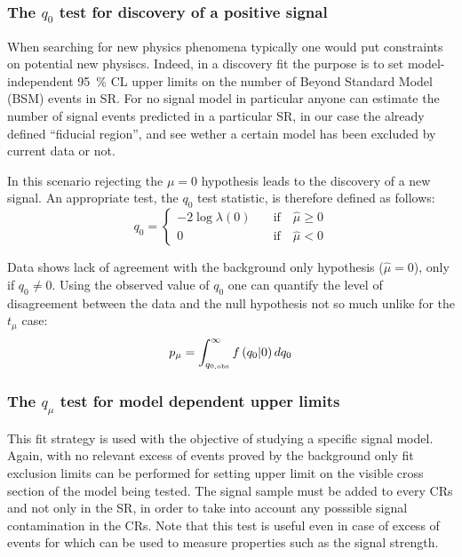 \subsubsection{The $q_0$ test for discovery of a positive signal}
When searching for new physics phenomena typically one would put constraints on potential new physiscs. Indeed, in a discovery fit the purpose is to set model-independent \SI{95}{\percent} CL upper limits on the number of Beyond Standard Model (BSM) events in SR. For no signal model in particular anyone can estimate the number of signal events predicted in a particular SR, in our case the already defined ``fiducial region'', and see wether a certain model has been excluded by current data or not.

In this scenario rejecting the $\mu = 0$ hypothesis leads to the discovery of a new signal.  An appropriate test, the $q_0$ test statistic, is therefore defined as follows:
\begin{equation}
q_0=
\left\{
\begin{aligned}
-2\log{\lambda(0)}\quad &\text{if}\quad \hat{\mu}\ge0\\
 0 \qquad&\text{if}\quad \hat{\mu}<0
\end{aligned}
\right.
\end{equation} 

Data shows lack of agreement with the background only hypothesis ($\hat{\mu}=0$), only if $q_0\ne0$. Using the observed value of $q_0$ one can quantify the level of disagreement between the data and the null hypothesis not so much unlike for the $t_\mu$ case:
\begin{equation}
 p_{\mu}=\int_{q_{0,\textup{obs}}}^\infty f\left(q_0 \vert 0\right) dq_0
 \label{eqn:pdaq0}
\end{equation}

\subsubsection{The $q_\mu$ test for model dependent upper limits}
This fit strategy is used with the objective of studying a specific signal model. Again, with no relevant excess of events proved by the background only fit exclusion limits can be performed for    setting upper limit on the visible cross section of the model being tested. The signal sample must be added to every CRs and not only in the SR, in order to take into account any posssible signal contamination in the CRs. Note that this test is useful even in case of excess of events for which can be used to measure properties such as the signal strength.

